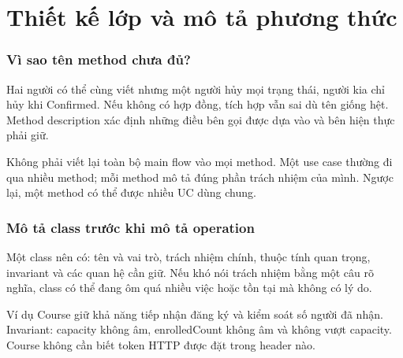 \chapter{Thiết kế lớp và mô tả phương thức}
\subsection{Vì sao tên method chưa đủ?}
Hai người có thể cùng viết  nhưng một người hủy mọi trạng thái, người kia chỉ hủy khi Confirmed. Nếu không có hợp đồng, tích hợp vẫn sai dù tên giống hệt. Method description xác định những điều bên gọi được dựa vào và bên hiện thực phải giữ.

Không phải viết lại toàn bộ main flow vào mọi method. Một use case thường đi qua nhiều method; mỗi method mô tả đúng phần trách nhiệm của mình. Ngược lại, một method có thể được nhiều UC dùng chung.

\subsection{Mô tả class trước khi mô tả operation}
Một class nên có: tên và vai trò, trách nhiệm chính, thuộc tính quan trọng, invariant và các quan hệ cần giữ. Nếu khó nói trách nhiệm bằng một câu rõ nghĩa, class có thể đang ôm quá nhiều việc hoặc tồn tại mà không có lý do.

Ví dụ Course giữ khả năng tiếp nhận đăng ký và kiểm soát số người đã nhận. Invariant: capacity không âm, enrolledCount không âm và không vượt capacity. Course không cần biết token HTTP được đặt trong header nào.

